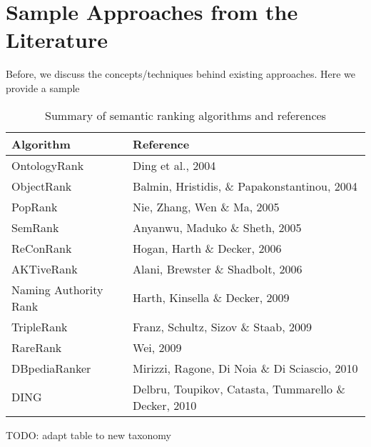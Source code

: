 \section{Sample Approaches from the Literature}
Before, we discuss the concepts/techniques behind existing approaches. Here we provide a sample  

\begin{table*}[htdp]
\begin{center}
\begin{tabular}{|l|l|}
\hline
\textbf{Algorithm}&\textbf{Reference}\\ \hline
OntologyRank & Ding et al., 2004 \cite{Ding2004}\\ \hline
ObjectRank & Balmin, Hristidis, \& Papakonstantinou, 2004 \cite{Balmin2004}\\ \hline
PopRank & Nie, Zhang, Wen \& Ma, 2005 \cite{Nie2005}\\ \hline
SemRank & Anyanwu, Maduko \& Sheth, 2005 \cite{Anyanwu2005}\\ \hline
ReConRank	& Hogan, Harth \& Decker, 2006 \cite{Hogan2006}\\ \hline
AKTiveRank	 & Alani, Brewster \& Shadbolt, 2006 \cite{Alani2006}\\ \hline
Naming Authority Rank & Harth, Kinsella \& Decker, 2009 \cite{Harth2009}\\ \hline
TripleRank & Franz, Schultz, Sizov \& Staab, 2009 \cite{Franz2009}\\ \hline
RareRank & Wei, 2009 \cite{Wei2009}\\ \hline
DBpediaRanker	& Mirizzi, Ragone, Di Noia \& Di Sciascio, 2010 \cite{Mirizzi2010}\\ \hline
DING & Delbru, Toupikov, Catasta, Tummarello \& Decker, 2010 \cite{Delbru2010}\\ \hline
\end{tabular}
\end{center}
\caption{Summary of semantic ranking algorithms and references}
\label{tab:table1}
\end{table*}%


TODO: adapt table to new taxonomy

